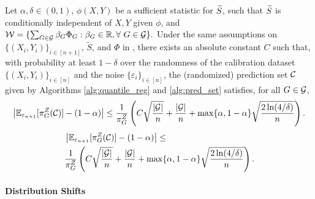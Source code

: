 \begin{corollary}
\label{cor: fract-cov}
Let $\alpha, \delta \in (0,1)$, $\phi(X,Y)$ be a sufficient statistic for ${\widetilde{S}}$, such that ${\widetilde{S}}$ is conditionally independent of $X,Y$ given $\phi$, and
    $
        {\cal W} = \{\sum_{G \in {\cal G}} \beta_G \Phi_G: \beta_G \in \mathbb{R}, \forall~G\in{\cal G}\}.
    $
    Under the same assumptions on $\{(X_i, Y_i)\}_{i\in [n+1]}$, $\tilde S$, and $\Phi$  in , there exists an absolute constant $C$ such that, with probability at least $1-\delta$ over the randomness of the calibration dataset $\{(X_i,Y_i)\}_{i\in [n]}$ and the noise $\{\varepsilon_i\}_{i \in [n]}$, the (randomized) prediction set ${\cal C}$ given by Algorithms \ref{alg:quantile_reg} and \ref{alg:pred_set} satisfies, for all $G \in {\cal G}$,
    \ifarxiv
    \begin{align*}
    \left|\mathbb{E}_{\varepsilon_{n+1}}[\pi^Z_{G}({\cal C})] -(1-\alpha)\right| \leq 
    \frac{1}{\pi_G^Z} 
     \left( C\sqrt{\frac{|{\cal G}|}{n}}+\frac{|{\cal G}|}{n}+\max \{\alpha, 1-\alpha\}\sqrt{\frac{2\ln(4/\delta)}{n}}  \right).
    \end{align*} 
    \else
    \begin{align*}
    &\left|\mathbb{E}_{\varepsilon_{n+1}}[\pi^Z_{G}({\cal C})] -(1-\alpha)\right| \leq \\
    &\frac{1}{\pi_G^Z} 
     \left( C\sqrt{\frac{|{\cal G}|}{n}}+\frac{|{\cal G}|}{n}+\max \{\alpha, 1-\alpha\}\sqrt{\frac{2\ln(4/\delta)}{n}}  \right).
    \end{align*}     
    \fi
\end{corollary}
 


\paragraph{Distribution Shifts}

